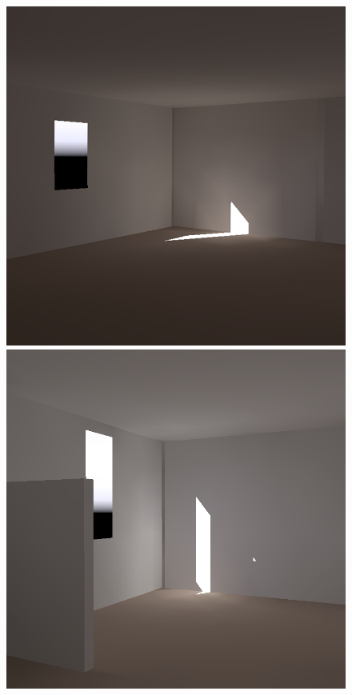 \begin{figure}[t]
\begin{small}
\includegraphics[width=\figwidth]{p2r_063_camera_chris_march_crop.png} \hfill   %
\includegraphics[width=\figwidth]{p2r_050_camera_chris_march.png} \hfill   %

\end{small}
\end{figure}
